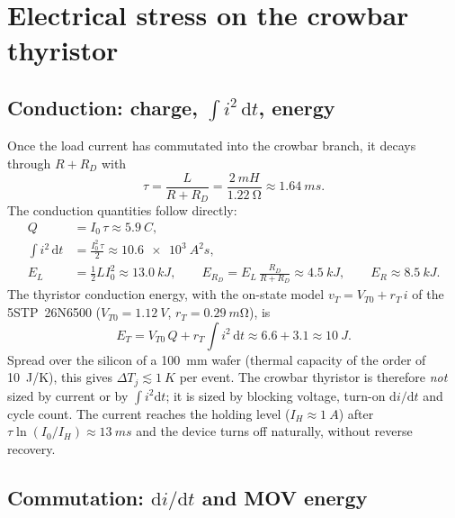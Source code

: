 \documentclass[11pt,a4paper]{article}
\begin{document}
\section{Electrical stress on the crowbar thyristor}

\subsection{Conduction: charge, $\int i^2\,\mathrm{d}t$, energy}

Once the load current has commutated into the crowbar branch, it decays through
$R + R_D$ with
\begin{equation}
  \tau = \frac{L}{R + R_D} = \frac{\SI{2}{mH}}{\SI{1.22}{\ohm}} \approx \SI{1.64}{ms}.
\end{equation}
The conduction quantities follow directly:
\begin{align}
  Q &= I_0\,\tau \approx \SI{5.9}{C}, \\
  \int i^2\,\mathrm{d}t &= \frac{I_0^2\,\tau}{2} \approx \SI{10.6e3}{A^2 s}, \\
  E_{L} &= \tfrac12 L I_0^2 \approx \SI{13.0}{kJ},
  \qquad E_{R_D} = E_L\,\frac{R_D}{R+R_D} \approx \SI{4.5}{kJ},
  \qquad E_{R} \approx \SI{8.5}{kJ}.
\end{align}
The thyristor conduction energy, with the on-state model $v_T = V_{T0} + r_T\,i$ of the
5STP~26N6500 ($V_{T0} = \SI{1.12}{V}$, $r_T = \SI{0.29}{m\ohm}$), is
\begin{equation}
  E_T = V_{T0}\,Q + r_T \int i^2\,\mathrm{d}t \approx 6.6 + 3.1 \approx \SI{10}{J}.
\end{equation}
Spread over the silicon of a \SI{100}{mm} wafer (thermal capacity of the order of
\SI{10}{J/K}), this gives $\Delta T_j \lesssim \SI{1}{K}$ per event. The crowbar
thyristor is therefore \emph{not} sized by current or by $\int i^2\mathrm{d}t$; it is sized by
blocking voltage, turn-on $\mathrm{d}i/\mathrm{d}t$ and cycle count. The current reaches the
holding level ($I_H \approx \SI{1}{A}$) after $\tau\ln(I_0/I_H) \approx \SI{13}{ms}$ and the
device turns off naturally, without reverse recovery.

\subsection{Commutation: $\mathrm{d}i/\mathrm{d}t$ and MOV energy}
\end{document}
